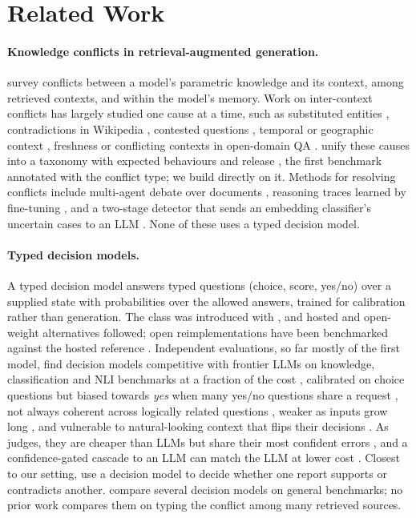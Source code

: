 \section{Related Work}
\label{sec:related}

\paragraph{Knowledge conflicts in retrieval-augmented generation.}
\citet{xu2024knowledge} survey conflicts between a model's parametric knowledge and its context, among retrieved
contexts, and within the model's memory. Work on inter-context conflicts has largely studied one cause at a time,
such as substituted entities \citep{longpre2021entity}, contradictions in Wikipedia \citep{hou2024wikicontradict},
contested questions \citep{wan2024evidence}, temporal or geographic context \citep{zhang2021situatedqa}, freshness
\citep{vu2023freshllms} or conflicting contexts in open-domain QA \citep{liu2024qacc}. \citet{cattan2025dragged}
unify these causes into a taxonomy with expected behaviours and release \conflicts, the first benchmark annotated
with the conflict type; we build directly on it. Methods for resolving conflicts include multi-agent debate over
documents \citep{wang2025madam}, reasoning traces learned by fine-tuning \citep{mishra2025facts}, and a two-stage
detector that sends an embedding classifier's uncertain cases to an LLM \citep{wang2026conflictrag}. None of these
uses a typed decision model.

\paragraph{Typed decision models.}
A typed decision model answers typed questions (choice, score, yes/no) over a supplied state with probabilities
over the allowed answers, trained for calibration rather than generation. The class was introduced with \jev
\citep{typesafe2026jev}, and hosted and open-weight alternatives followed; open reimplementations have been
benchmarked against the hosted reference \citep{weng2026ownjev}. Independent evaluations, so far mostly of the
first model, find decision models competitive with frontier LLMs on knowledge, classification and NLI benchmarks at
a fraction of the cost \citep{deusser2026jev,li2026specialized}, calibrated on choice questions but biased towards
\emph{yes} when many yes/no questions share a request \citep{deusser2026jev,li2026llm2jev}, not always coherent
across logically related questions \citep{li2026beyond}, weaker as inputs grow long \citep{duan2026general}, and
vulnerable to natural-looking context that flips their decisions \citep{xu2026jevout}. As judges, they are cheaper
than LLMs but share their most confident errors \citep{rao2026rubric}, and a confidence-gated cascade to an LLM can
match the LLM at lower cost \citep{li2026jevjudge}. Closest to our setting, \citet{huang2026radiology} use a decision
model to decide whether one report supports or contradicts another. \citet{duan2026general} compare several decision
models on general benchmarks; no prior work compares them on typing the conflict among many retrieved sources.

